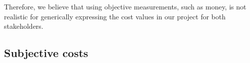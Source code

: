 Therefore, we believe that using objective measurements, such as money, is not realistic for generically expressing the cost values in our project for both stakeholders.

\subsection{Subjective costs}
